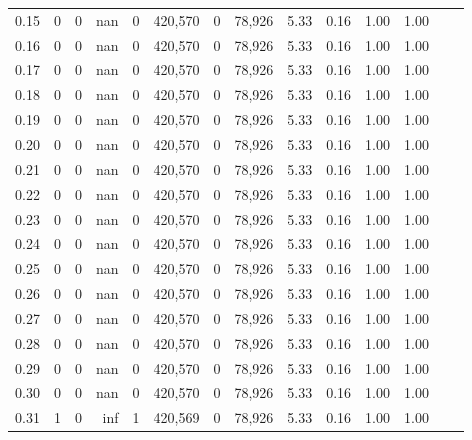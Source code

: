 \begin{tabular}{rrrrrrrrrrrrrr}
0.15 &       0 &       0 &     nan &        0 &  420,570 &       0 &  78,926 &  5.33 &  0.16 &  1.00 &      1.00 \\
0.16 &       0 &       0 &     nan &        0 &  420,570 &       0 &  78,926 &  5.33 &  0.16 &  1.00 &      1.00 \\
0.17 &       0 &       0 &     nan &        0 &  420,570 &       0 &  78,926 &  5.33 &  0.16 &  1.00 &      1.00 \\
0.18 &       0 &       0 &     nan &        0 &  420,570 &       0 &  78,926 &  5.33 &  0.16 &  1.00 &      1.00 \\
0.19 &       0 &       0 &     nan &        0 &  420,570 &       0 &  78,926 &  5.33 &  0.16 &  1.00 &      1.00 \\
0.20 &       0 &       0 &     nan &        0 &  420,570 &       0 &  78,926 &  5.33 &  0.16 &  1.00 &      1.00 \\
0.21 &       0 &       0 &     nan &        0 &  420,570 &       0 &  78,926 &  5.33 &  0.16 &  1.00 &      1.00 \\
0.22 &       0 &       0 &     nan &        0 &  420,570 &       0 &  78,926 &  5.33 &  0.16 &  1.00 &      1.00 \\
0.23 &       0 &       0 &     nan &        0 &  420,570 &       0 &  78,926 &  5.33 &  0.16 &  1.00 &      1.00 \\
0.24 &       0 &       0 &     nan &        0 &  420,570 &       0 &  78,926 &  5.33 &  0.16 &  1.00 &      1.00 \\
0.25 &       0 &       0 &     nan &        0 &  420,570 &       0 &  78,926 &  5.33 &  0.16 &  1.00 &      1.00 \\
0.26 &       0 &       0 &     nan &        0 &  420,570 &       0 &  78,926 &  5.33 &  0.16 &  1.00 &      1.00 \\
0.27 &       0 &       0 &     nan &        0 &  420,570 &       0 &  78,926 &  5.33 &  0.16 &  1.00 &      1.00 \\
0.28 &       0 &       0 &     nan &        0 &  420,570 &       0 &  78,926 &  5.33 &  0.16 &  1.00 &      1.00 \\
0.29 &       0 &       0 &     nan &        0 &  420,570 &       0 &  78,926 &  5.33 &  0.16 &  1.00 &      1.00 \\
0.30 &       0 &       0 &     nan &        0 &  420,570 &       0 &  78,926 &  5.33 &  0.16 &  1.00 &      1.00 \\
0.31 &       1 &       0 &     inf &        1 &  420,569 &       0 &  78,926 &  5.33 &  0.16 &  1.00 &      1.00 \\

\end{tabular}
